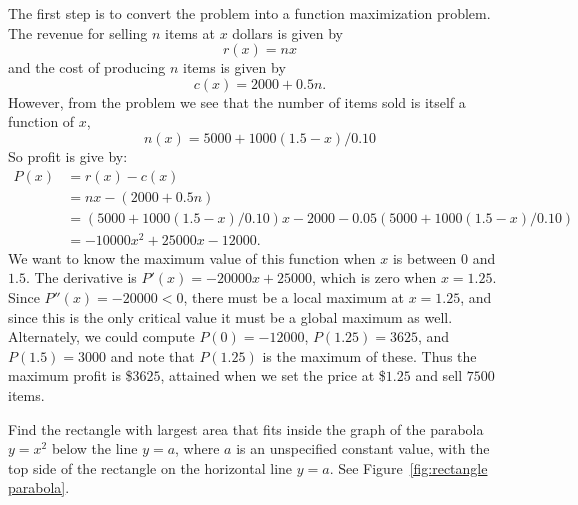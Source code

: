 \begin{solution}
The first step is to convert the problem into a function maximization
problem. The revenue for selling $n$ items at $x$ dollars is given by
\[
r(x) = nx
\]
and the cost of producing $n$ items is given by
\[
c(x) = 2000+0.5 n. 
\]
However, from the problem we see that the number of items sold is
itself a function of $x$,
\[
n(x) =5000+1000(1.5-x)/0.10
\]
So profit is give by:
\begin{align*}
P(x) &= r(x) - c(x)\\
&= nx - (2000+0.5 n)\\
&= (5000+1000(1.5-x)/0.10)x - 2000 - 0.05 (5000+1000(1.5-x)/0.10)\\
&=-10000x^2+25000x-12000. 
\end{align*}
We want to know the maximum value of this function when $x$ is between
0 and $1.5$. The derivative is $P'(x)=-20000x+25000$, which is zero
when $x=1.25$. Since $P''(x)=-20000<0$, there must be a local maximum
at $x=1.25$, and since this is the only critical value it must be a
global maximum as well. Alternately, we could compute $P(0)=-12000$,
$P(1.25)=3625$, and $P(1.5)=3000$ and note that $P(1.25)$ is the
maximum of these. Thus the maximum profit is \$$3625$, attained when we
set the price at \$$1.25$ and sell $7500$ items. 
\end{solution}


\begin{example} 
Find the rectangle with largest area that fits inside the graph of the
parabola $y=x^2$ below the line $y=a$, where $a$ is an unspecified
constant value, with the top side of the rectangle on the horizontal
line $y=a$. See Figure~\ref{fig:rectangle parabola}.
\end{example}

